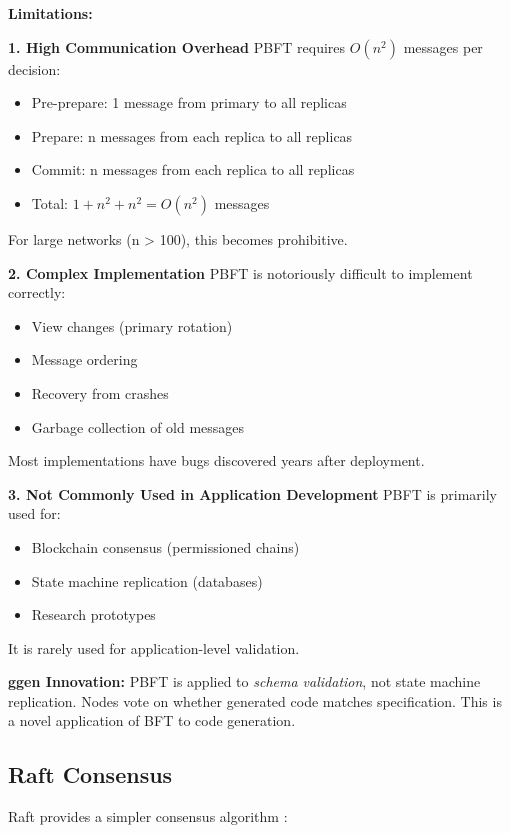 \textbf{Limitations:}

\textbf{1. High Communication Overhead}
PBFT requires \(O(n^2)\) messages per decision:
\begin{itemize}
    \item Pre-prepare: 1 message from primary to all replicas
    \item Prepare: n messages from each replica to all replicas
    \item Commit: n messages from each replica to all replicas
    \item Total: \(1 + n^2 + n^2 = O(n^2)\) messages
\end{itemize}

For large networks (n > 100), this becomes prohibitive.

\textbf{2. Complex Implementation}
PBFT is notoriously difficult to implement correctly:
\begin{itemize}
    \item View changes (primary rotation)
    \item Message ordering
    \item Recovery from crashes
    \item Garbage collection of old messages
\end{itemize}

Most implementations have bugs discovered years after deployment.

\textbf{3. Not Commonly Used in Application Development}
PBFT is primarily used for:
\begin{itemize}
    \item Blockchain consensus (permissioned chains)
    \item State machine replication (databases)
    \item Research prototypes
\end{itemize}

It is rarely used for application-level validation.

\textbf{ggen Innovation:} PBFT is applied to \textit{schema validation}, not state machine replication. Nodes vote on whether generated code matches specification. This is a novel application of BFT to code generation.

\subsection{Raft Consensus}

Raft provides a simpler consensus algorithm \cite{ongaro2014raft}:

